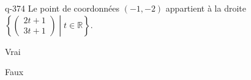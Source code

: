 \begin{truefalse}{q-374}
Le point de coordonnées $(-1,-2)$ appartient à la droite  $\left\{\begin{pmatrix}2t+1\\3t+1\end{pmatrix}\middle| t\in\mathbb{R}\right\}$.
\item* Vrai
\item Faux
\end{truefalse}

